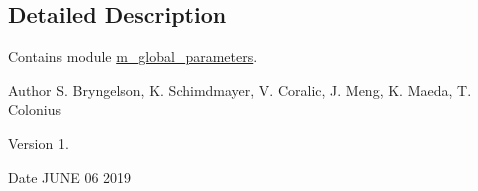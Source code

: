 \subsection{Detailed Description}
Contains module \hyperlink{namespacem__global__parameters}{m\+\_\+global\+\_\+parameters}. 

\begin{DoxyAuthor}{Author}
S. Bryngelson, K. Schimdmayer, V. Coralic, J. Meng, K. Maeda, T. Colonius 
\end{DoxyAuthor}
\begin{DoxyVersion}{Version}
1. 
\end{DoxyVersion}
\begin{DoxyDate}{Date}
J\+U\+NE 06 2019 
\end{DoxyDate}
